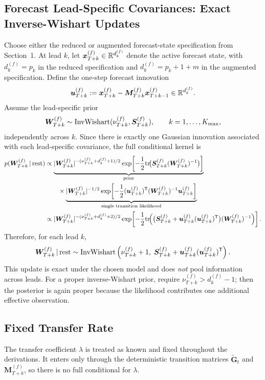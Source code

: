 \subsection{Forecast Lead-Specific Covariances: Exact Inverse-Wishart Updates}
Choose either the reduced or augmented forecast-state specification from Section~1.
At lead $k$, let $\bm x_{T+k}^{(f)}\in\mathbb{R}^{d_k^{(f)}}$ denote the active forecast state, with
$d_k^{(f)}=p_k$ in the reduced specification and $d_k^{(f)}=p_k+1+m$ in the augmented specification.
Define the one-step forecast innovation
\begin{align}
\bm u_{T+k}^{(f)}
:=
\bm x_{T+k}^{(f)}-\bm M_{T+k}^{(f)}\bm x_{T+k-1}^{(f)}
\in\mathbb{R}^{d_k^{(f)}}.
\label{eq:fcast_innovation}
\end{align}
Assume the lead-specific prior
\begin{align}
\bm W_{T+k}^{(f)}\sim\mathrm{InvWishart}(\nu_{T+k}^{(f)},\bm S_{T+k}^{(f)}),
\qquad k=1,\dots,K_{\max},
\end{align}
independently across $k$.
Since there is exactly one Gaussian innovation associated with each lead-specific covariance,
the full conditional kernel is
\begin{align}
p(\bm W_{T+k}^{(f)}\,|\,\text{rest})
&\propto
\underbrace{|\bm W_{T+k}^{(f)}|^{-(\nu_{T+k}^{(f)}+d_k^{(f)}+1)/2}
\exp\!\left[-\frac12\mathrm{tr}\!\big(\bm S_{T+k}^{(f)}(\bm W_{T+k}^{(f)})^{-1}\big)\right]}_{\text{prior}}
\nonumber\\
&\qquad\times
\underbrace{|\bm W_{T+k}^{(f)}|^{-1/2}
\exp\!\left[-\frac12(\bm u_{T+k}^{(f)})^{\mathsf{T}}(\bm W_{T+k}^{(f)})^{-1}\bm u_{T+k}^{(f)}\right]}_{\text{single transition likelihood}}
\nonumber\\
&\propto
|\bm W_{T+k}^{(f)}|^{-(\nu_{T+k}^{(f)}+d_k^{(f)}+2)/2}
\exp\!\left[-\frac12\mathrm{tr}\!\Big(\big(\bm S_{T+k}^{(f)}+\bm u_{T+k}^{(f)}(\bm u_{T+k}^{(f)})^{\mathsf{T}}\big)(\bm W_{T+k}^{(f)})^{-1}\Big)\right].
\end{align}
Therefore, for each lead $k$,
\begin{align}
\bm W_{T+k}^{(f)}\,|\,\text{rest}
\sim\mathrm{InvWishart}\left(\nu_{T+k}^{(f)}+1,\;\bm S_{T+k}^{(f)}+\bm u_{T+k}^{(f)}(\bm u_{T+k}^{(f)})^{\mathsf{T}}\right).
\label{eq:cond_W_fcast}
\end{align}
This update is exact under the chosen model and does \emph{not} pool information across leads.
For a proper inverse-Wishart prior, require $\nu_{T+k}^{(f)}>d_k^{(f)}-1$; then the posterior
is again proper because the likelihood contributes one additional effective observation.

\subsection{Fixed Transfer Rate}
The transfer coefficient $\lambda$ is treated as known and fixed throughout the derivations.
It enters only through the deterministic transition matrices $\tilde{\bm G}_t$ and
$\bm M_{T+k}^{(f)}$, so there is no full conditional for $\lambda$.
